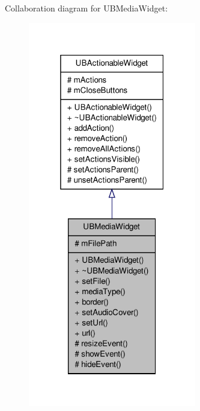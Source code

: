 Collaboration diagram for U\-B\-Media\-Widget\-:
\nopagebreak
\begin{figure}[H]
\begin{center}
\leavevmode
\includegraphics[width=208pt]{d9/db2/class_u_b_media_widget__coll__graph}
\end{center}
\end{figure}
